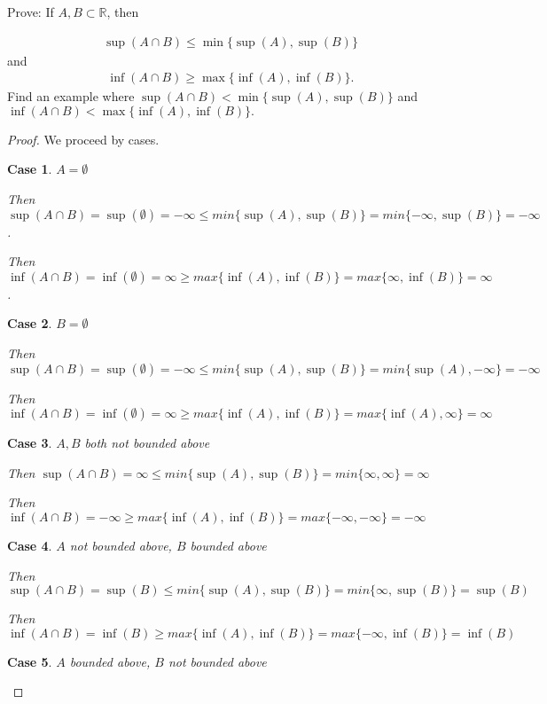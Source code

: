 \documentclass{article} %
\theoremstyle{plain}
\newtheorem{case}{Case}
\theoremstyle{definition}
\newcommand{\Rb}{\mathbb{R}}
\begin{document}
\noindent{} Prove: If $A, B \subset \Rb$, then 

\begin{align*}
\sup(A \cap B) \leq \min\{\sup(A), \sup(B)\}
\end{align*}
and 
\begin{align*}
\inf(A \cap B) \geq \max\{\inf(A), \inf(B)\}.
\end{align*}
Find an example where $\sup(A \cap B) < \min\{\sup(A), \sup(B)\}$ and $\inf(A \cap B) < \max\{\inf(A), \inf(B)\}.$

\begin{proof} 
    We proceed by cases.

    \begin{case} $A = \emptyset$

        Then $\sup(A \cap B) = \sup(\emptyset) = - \infty \leq min\{\sup(A), \sup(B)\} = min\{- \infty, \sup(B)\} = - \infty$.

        Then $\inf(A \cap B) = \inf(\emptyset) = \infty \geq max\{\inf(A), \inf(B)\} = max\{\infty, \inf(B)\} = \infty$.
    \end{case}
    \begin{case} $B = \emptyset$

        Then $\sup(A \cap B) = \sup(\emptyset) = - \infty \leq min\{\sup(A), \sup(B)\} = min\{\sup(A), - \infty\} = - \infty$

        Then $\inf(A \cap B) = \inf(\emptyset) = \infty \geq max\{\inf(A), \inf(B)\} = max\{\inf(A), \infty\} = \infty$
    \end{case}
    \begin{case} $A, B$ both not bounded above

        Then $\sup(A \cap B) = \infty \leq min\{\sup(A), \sup(B)\} = min\{\infty, \infty \} = \infty$
        
        Then $\inf(A \cap B) = - \infty \geq max\{\inf(A), \inf(B)\} = max\{- \infty, - \infty \} = - \infty$
    \end{case}
    \begin{case} $A$ not bounded above, $B$ bounded above

        Then $\sup(A \cap B) = \sup(B) \leq min\{\sup(A), \sup(B)\} = min\{\infty, \sup(B) \} = \sup(B)$
        
        Then $\inf(A \cap B) = \inf(B) \geq max\{\inf(A), \inf(B)\} = max\{-\infty, \inf(B) \} = \inf(B)$
    \end{case}
    \begin{case} $A$ bounded above, $B$ not bounded above


\end{case}
\end{proof}
\end{document}
